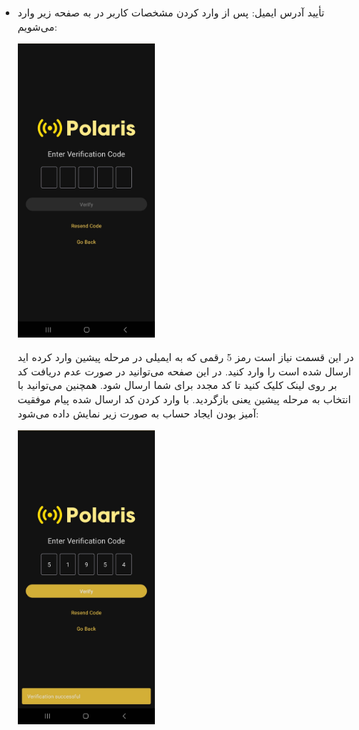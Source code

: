 \begin{itemize}
\begin{itemize}
		\item  تأیید آدرس ایمیل: پس از وارد کردن مشخصات کاربر در  به صفحه زیر وارد می‌شویم:
			\begin{center}
				\includegraphics[width=0.4\textwidth]{images/verify-empty.jpg}
			\end{center}
		در این قسمت نیاز است رمز 5 رقمی که به ایمیلی در مرحله پیشین وارد کرده اید ارسال شده است را وارد کنید. در این صفحه می‌توانید در صورت عدم دریافت کد بر روی لینک  کلیک کنید تا کد مجدد برای شما ارسال شود. همچنین می‌توانید با انتخاب  به مرحله پیشین یعنی  بازگردید. با وارد کردن کد ارسال شده پیام موفقیت آمیز بودن ایجاد حساب به صورت زیر نمایش داده می‌شود:
		\begin{center}
			\includegraphics[width=0.4\textwidth]{images/verify-success.jpg}

\end{center}
\end{itemize}
\end{itemize}
